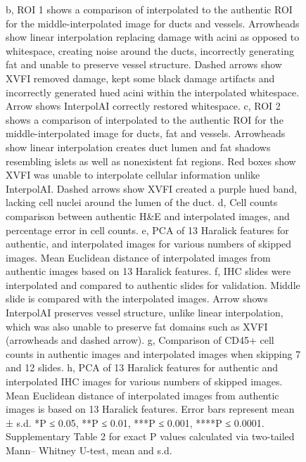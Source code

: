 \begin{refsection}
    \begin{figure}[h!]
        \ContinuedFloat
        \captionsetup{font=small}
        \caption[]{ b, ROI 1 shows a comparison of interpolated to
            the authentic ROI for the middle-interpolated image for ducts and vessels.
            Arrowheads show linear interpolation replacing damage with acini as opposed
            to whitespace, creating noise around the ducts, incorrectly generating fat
            and unable to preserve vessel structure. Dashed arrows show XVFI removed
            damage, kept some black damage artifacts and incorrectly generated hued acini
            within the interpolated whitespace. Arrow shows InterpolAI correctly restored
            whitespace. c, ROI 2 shows a comparison of interpolated to the authentic ROI for
            the middle-interpolated image for ducts, fat and vessels. Arrowheads show linear
            interpolation creates duct lumen and fat shadows resembling islets as well as
            nonexistent fat regions. Red boxes show XVFI was unable to interpolate cellular
            information unlike InterpolAI. Dashed arrows show XVFI created a purple hued
            band, lacking cell nuclei around the lumen of the duct. d, Cell counts comparison
            between authentic H\&E and interpolated images, and percentage error in cell
            counts. e, PCA of 13 Haralick features for authentic, and interpolated images for
            various numbers of skipped images. Mean Euclidean distance of interpolated
            images from authentic images based on 13 Haralick features. f, IHC slides were
            interpolated and compared to authentic slides for validation. Middle slide is
            compared with the interpolated images. Arrow shows InterpolAI preserves
            vessel structure, unlike linear interpolation, which was also unable to preserve
            fat domains such as XVFI (arrowheads and dashed arrow). g, Comparison of
            CD45+ cell counts in authentic images and interpolated images when skipping
            7 and 12 slides. h, PCA of 13 Haralick features for authentic and interpolated
            IHC images for various numbers of skipped images. Mean Euclidean distance
            of interpolated images from authentic images is based on 13 Haralick features.
            Error bars represent mean ± s.d. *P ≤ 0.05, **P ≤ 0.01, ***P ≤ 0.001, ****P ≤ 0.0001.
            Supplementary Table 2 for exact P values calculated via two-tailed Mann–
            Whitney U-test, mean and s.d.}
    \end{figure}
    

\end{refsection}

